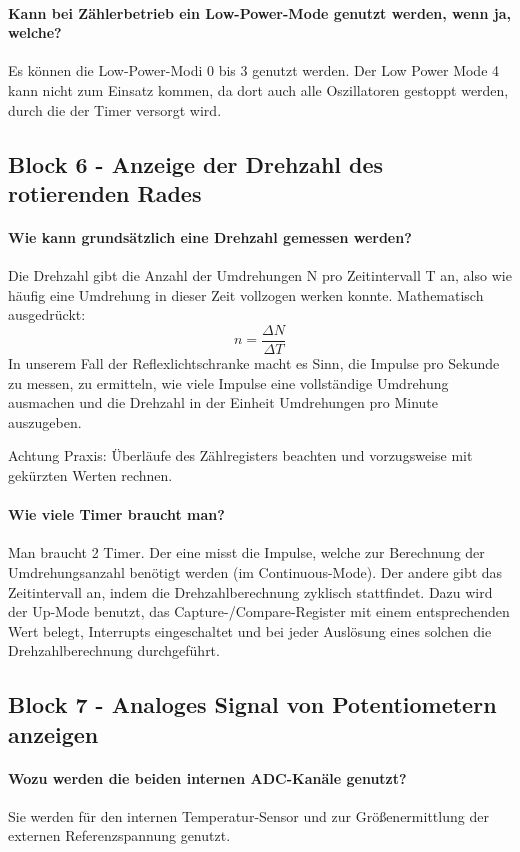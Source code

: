 \documentclass[12pt,a4paper,bibliography=totocnumbered,listof=totocnumbered]{scrartcl}
\begin{document}
\paragraph{Kann bei Zählerbetrieb ein Low-Power-Mode genutzt werden, wenn ja, welche?} Es können die Low-Power-Modi 0 bis 3 genutzt werden. Der Low Power Mode 4 kann nicht zum Einsatz kommen, da dort auch alle Oszillatoren gestoppt werden, durch die der Timer versorgt wird.


\subsection{Block 6 - Anzeige der Drehzahl des rotierenden Rades}
\paragraph{Wie kann grundsätzlich eine Drehzahl gemessen werden?}
Die Drehzahl gibt die Anzahl der Umdrehungen N pro Zeitintervall T an, also wie häufig eine Umdrehung in dieser Zeit vollzogen werken konnte. Mathematisch ausgedrückt:
\[ n = \frac{\Delta N}{\Delta T}  \]
In unserem Fall der Reflexlichtschranke macht es Sinn, die Impulse pro Sekunde zu messen, zu ermitteln, wie viele Impulse eine vollständige Umdrehung ausmachen und die Drehzahl in der Einheit Umdrehungen pro Minute auszugeben. 

Achtung Praxis: Überläufe des Zählregisters beachten und vorzugsweise mit gekürzten Werten rechnen.

\paragraph{Wie viele Timer braucht man?}
Man braucht 2 Timer. Der eine misst die Impulse, welche zur Berechnung der Umdrehungsanzahl benötigt werden (im Continuous-Mode). Der andere gibt das Zeitintervall an, indem die Drehzahlberechnung zyklisch stattfindet. Dazu wird der Up-Mode benutzt, das Capture-/Compare-Register mit einem entsprechenden Wert belegt, Interrupts eingeschaltet und bei jeder Auslösung eines solchen die Drehzahlberechnung durchgeführt. 


\subsection{Block 7 - Analoges Signal von Potentiometern anzeigen}
\paragraph{Wozu werden die beiden internen ADC-Kanäle genutzt?}
Sie werden für den internen Temperatur-Sensor und zur Größenermittlung der externen Referenzspannung genutzt.
\end{document}
